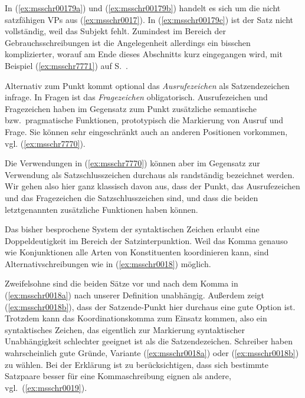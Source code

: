 In (\ref{ex:msschr00179a}) und (\ref{ex:msschr00179b}) handelt es sich um die nicht satzfähigen VPs aus (\ref{ex:msschr0017}).
In (\ref{ex:msschr00179c}) ist der Satz nicht vollständig, weil das Subjekt fehlt.
Zumindest im Bereich der Gebrauchsschreibungen ist die Angelegenheit allerdings ein bisschen komplizierter, worauf am Ende dieses Abschnitts kurz eingegangen wird, \zB mit Beispiel (\ref{ex:msschr7771}) auf S.~\pageref{ex:msschr7771}.

Alternativ zum Punkt kommt optional das \textit{Ausrufezeichen} als Satzendezeichen infrage.
In Fragen ist das \textit{Fragezeichen} obligatorisch.
Ausrufezeichen und Fragezeichen haben im Gegensatz zum Punkt zusätzliche semantische bzw.\ pragmatische Funktionen, prototypisch die Markierung von Ausruf und Frage.
Sie können sehr eingeschränkt auch an anderen Positionen vorkommen, vgl. (\ref{ex:msschr7770}).

\begin{exe}
  \ex\label{ex:msschr7770}
  \begin{xlist}
  \end{xlist}
\end{exe}

Die Verwendungen in (\ref{ex:msschr7770}) können aber im Gegensatz zur Verwendung als Satzschlusszeichen durchaus als randständig bezeichnet werden.
Wir gehen also hier ganz klassisch davon aus, dass der Punkt, das Ausrufezeichen und das Fragezeichen die Satzschlusszeichen sind, und dass die beiden letztgenannten zusätzliche Funktionen haben können.

Das bisher besprochene System der syntaktischen Zeichen erlaubt eine Doppeldeutigkeit im Bereich der Satzinterpunktion.
Weil das Komma genauso wie Konjunktionen alle Arten von Konstituenten koordinieren kann, sind Alternativschreibungen wie in (\ref{ex:msschr0018}) möglich.

\begin{exe}
  \ex\label{ex:msschr0018} 
  \begin{xlist}
  \end{xlist}
\end{exe}

Zweifelsohne sind die beiden Sätze vor und nach dem Komma in (\ref{ex:msschr0018a}) nach unserer Definition unabhängig.
Außerdem zeigt (\ref{ex:msschr0018b}), dass der Satzende-Punkt hier durchaus eine gute Option ist.
Trotzdem kann das Koordinationskomma zum Einsatz kommen, also ein syntaktisches Zeichen, das eigentlich zur Markierung syntaktischer Unabhängigkeit schlechter geeignet ist als die Satzendezeichen.
Schreiber haben wahrscheinlich gute Gründe, Variante (\ref{ex:msschr0018a}) oder (\ref{ex:msschr0018b}) zu wählen.
Bei der Erklärung ist zu berücksichtigen, dass sich bestimmte Satzpaare besser für eine Kommaschreibung eignen als andere, vgl.\ (\ref{ex:msschr0019}).

